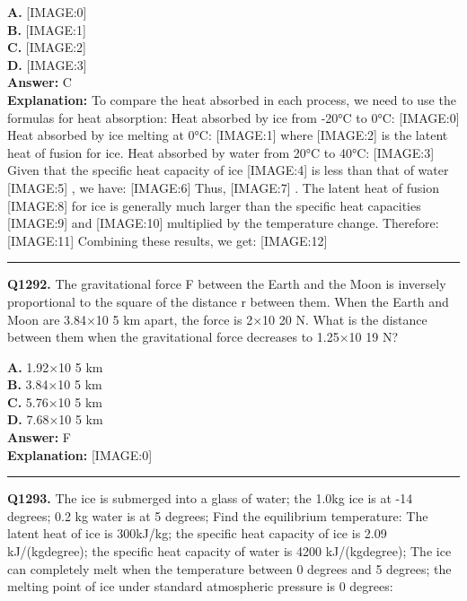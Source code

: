 \documentclass[12pt]{article}
\begin{document}
\textbf{A.} [IMAGE:0] \\
\textbf{B.} [IMAGE:1] \\
\textbf{C.} [IMAGE:2] \\
\textbf{D.} [IMAGE:3] \\

\textbf{Answer:} C \\
\textbf{Explanation:} To compare the heat absorbed in each process, we need to use the formulas for heat absorption:
Heat absorbed by ice from -20°C to 0°C:
[IMAGE:0]
Heat absorbed by ice melting at 0°C:
[IMAGE:1]
where
[IMAGE:2]
is the latent heat of fusion for ice.
Heat absorbed by water from 20°C to 40°C:
[IMAGE:3]
Given that the specific heat capacity of ice
[IMAGE:4]
is less than that of water
[IMAGE:5]
, we have:
[IMAGE:6]
Thus,
[IMAGE:7]
.
The latent heat of fusion
[IMAGE:8]
for ice is generally much larger than the specific heat capacities
[IMAGE:9]
and
[IMAGE:10]
multiplied by the temperature change. Therefore:
[IMAGE:11]
Combining these results, we get:
[IMAGE:12]

\hrule
\vspace{1em}


\noindent
\textbf{Q1292.} The gravitational force F between the Earth and the Moon is inversely proportional to the square of the distance r between them. When the Earth and Moon are 3.84×10
5
km apart, the force is 2×10
20
N. What is the distance between them when the gravitational force decreases to 1.25×10
19
N?



\textbf{A.} 1.92×10
5
km \\
\textbf{B.} 3.84×10
5
km \\
\textbf{C.} 5.76×10
5
km \\
\textbf{D.} 7.68×10
5
km \\

\textbf{Answer:} F \\
\textbf{Explanation:} [IMAGE:0]

\hrule
\vspace{1em}


\noindent
\textbf{Q1293.} The ice is submerged into a glass of water; the 1.0kg ice is at -14 degrees; 0.2 kg water is at 5 degrees; Find the equilibrium temperature: The latent heat of ice is 300kJ/kg; the specific heat capacity of ice is 2.09 kJ/(kg\cdot degree); the specific heat capacity of water is 4200 kJ/(kg\cdot degree); The ice can completely melt when the temperature between 0 degrees and 5 degrees; the melting point of ice under standard atmospheric pressure is 0 degrees:
\end{document}
